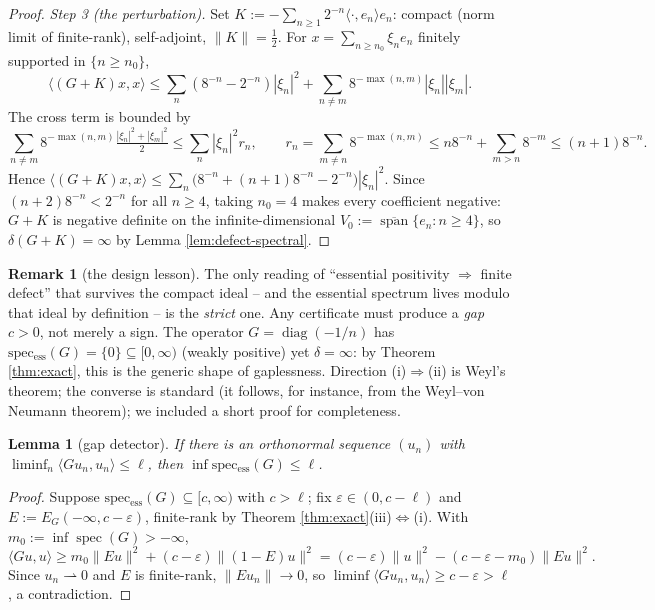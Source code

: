 \documentclass[11pt,reqno]{amsart}
\newtheorem{lemma}[theorem]{Lemma}
\theoremstyle{definition}
\newtheorem{remark}[theorem]{Remark}
\newcommand{\spec}{\operatorname{spec}}
\newcommand{\specess}{\operatorname{spec_{ess}}}
\newcommand{\half}{\tfrac12}
\begin{document}
\begin{proof}
\emph{Step 3 (the perturbation).} Set
\(K:=-\sum_{n\geq1}2^{-n}\langle\cdot,e_n\rangle e_n\): compact (norm limit of
finite-rank), self-adjoint, \(\|K\|=\half\). For
\(x=\sum_{n\geq n_0}\xi_n e_n\) finitely supported in \(\{n\geq n_0\}\),
\[
\langle(G+K)x,x\rangle\leq\sum_n(8^{-n}-2^{-n})|\xi_n|^2
+\sum_{n\neq m}8^{-\max(n,m)}|\xi_n||\xi_m|.
\]
The cross term is bounded by
\[
\sum_{n\neq m}8^{-\max(n,m)}\tfrac{|\xi_n|^2+|\xi_m|^2}{2}
\leq\sum_n|\xi_n|^2 r_n,\qquad
r_n=\sum_{m\neq n}8^{-\max(n,m)}\leq n8^{-n}+\sum_{m>n}8^{-m}\leq(n+1)8^{-n}.
\]
Hence
\(\langle(G+K)x,x\rangle\leq\sum_n\bigl(8^{-n}+(n+1)8^{-n}-2^{-n}\bigr)|\xi_n|^2\).
Since \((n+2)8^{-n}<2^{-n}\) for all \(n\geq4\), taking \(n_0=4\) makes every
coefficient negative: \(G+K\) is negative definite on the
infinite-dimensional \(V_0:=\overline{\operatorname{span}}\{e_n:n\geq4\}\), so
\(\delta(G+K)=\infty\) by Lemma \ref{lem:defect-spectral}.
\end{proof}

\begin{remark}[the design lesson]\label{rem:design}
The only reading of ``essential positivity \(\Rightarrow\) finite defect'' that
survives the compact ideal -- and the essential spectrum lives modulo that ideal
by definition -- is the \emph{strict} one. Any certificate must produce a
\emph{gap} \(c>0\), not merely a sign. The operator \(G=\operatorname{diag}(-1/n)\)
has \(\specess(G)=\{0\}\subseteq[0,\infty)\) (weakly positive) yet
\(\delta=\infty\): by Theorem \ref{thm:exact}, this is the generic shape of
gaplessness. Direction (i)\(\Rightarrow\)(ii) is Weyl's theorem; the converse
is standard (it follows, for instance, from the Weyl--von Neumann theorem); we
included a short proof for completeness.
\end{remark}

\begin{lemma}[gap detector]\label{lem:gap-detector}
If there is an orthonormal sequence \((u_n)\) with
\(\liminf_n\langle Gu_n,u_n\rangle\leq\ell\), then
\(\inf\specess(G)\leq\ell\).
\end{lemma}

\begin{proof}
Suppose \(\specess(G)\subseteq[c,\infty)\) with \(c>\ell\); fix
\(\varepsilon\in(0,c-\ell)\) and \(E:=E_G(-\infty,c-\varepsilon)\), finite-rank
by Theorem \ref{thm:exact}(iii)\(\Leftrightarrow\)(i). With
\(m_0:=\inf\spec(G)>-\infty\),
\[
\langle Gu,u\rangle\geq m_0\|Eu\|^2+(c-\varepsilon)\|(1-E)u\|^2
=(c-\varepsilon)\|u\|^2-(c-\varepsilon-m_0)\|Eu\|^2 .
\]
Since \(u_n\rightharpoonup0\) and \(E\) is finite-rank, \(\|Eu_n\|\to0\), so
\(\liminf\langle Gu_n,u_n\rangle\geq c-\varepsilon>\ell\), a contradiction.
\end{proof}
\end{document}
